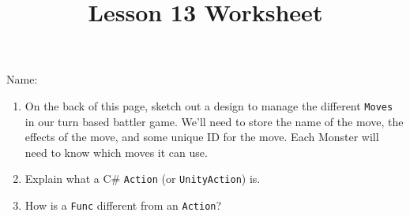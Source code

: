 \documentclass[12pt]{../rhitcsse}
\title{Lesson 13 Worksheet}
\begin{document}
\maketitle

\vspace*{0.15in}\hspace{0.25in}Name:\hrulefill\hspace{0.25in}\hspace{0.25in}

\begin{enumerate}
  \item On the back of this page, sketch out a design to manage the different
   \texttt{Moves} in our turn based battler game. 
  We'll need to store the name of the move, the effects of the move, and some 
  unique ID for the move. Each Monster will need to know which moves it can use.
  \item Explain what a C\# \texttt{Action} (or \texttt{UnityAction}) is.
  \vfill
  \item How is a \texttt{Func} different from an \texttt{Action}?
  \vfill

\end{enumerate}
\end{document}
